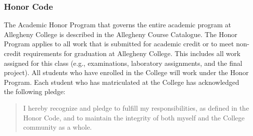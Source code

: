 \subsubsection*{Honor Code}

The Academic Honor Program that governs the entire academic program at Allegheny College is described in the Allegheny
Course Catalogue.  The Honor Program applies to all work that is submitted for academic credit or to meet non-credit
requirements for graduation at Allegheny College.  This includes all work assigned for this class (e.g., examinations,
laboratory assignments, and the final project).  All students who have enrolled in the College will work under the Honor
Program.  Each student who has matriculated at the College has acknowledged the following pledge:

\begin{quote}
I hereby recognize and pledge to fulfill my responsibilities, as defined in the Honor Code, and to maintain the
integrity of both myself and the College community as a whole.  
\end{quote}


